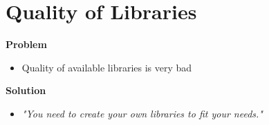 \section{Quality of Libraries}

\begin{frame}{\secname}
  \textbf{Problem}
  \begin{itemize}
    \item Quality of available libraries is very bad
  \end{itemize}

  \pause

  \textbf{Solution}
  \begin{itemize}
    \item \textit{"You need to create your own libraries to fit your needs."}
  \end{itemize}

  \pause

\end{frame}
